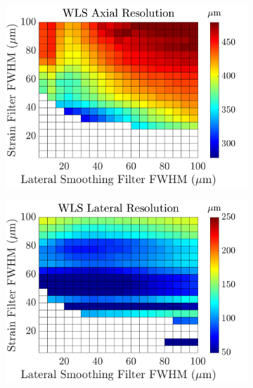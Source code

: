 \begin{figure}[h!]
	\centering
	\begin{subfigure}{0.49\textwidth}
		\centering
		\includegraphics[width=\textwidth]{imageres_figs/wls_axial.png}
	\end{subfigure}
	\begin{subfigure}{0.49\textwidth}
		\centering
		\includegraphics[width=\textwidth]{imageres_figs/wls_lateral.png}
	\end{subfigure}
	\\
	\begin{subfigure}{0.49\textwidth}
		\centering

\end{subfigure}
\end{figure}
